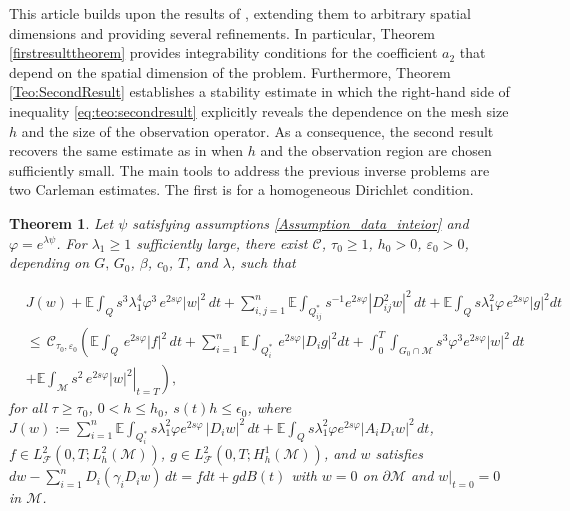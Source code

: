 \documentclass[11pt,oneside,leqno]{amsart}
\numberwithin{equation}{section}
\numberwithin{equation}{section}
\newcommand{\E}{\mathbb{E}}
\newtheorem{theorem}{Theorem}[section]
\begin{document}
This article builds upon the results of \cite{WWW:2024}, extending them to arbitrary spatial dimensions and providing several refinements. In particular, Theorem \ref{firstresulttheorem} provides integrability conditions for the coefficient $a_2$ that depend on the spatial dimension of the problem. Furthermore, Theorem \ref{Teo:SecondResult} establishes a stability estimate in which the right-hand side of inequality \eqref{eq:teo:secondresult} explicitly reveals the dependence on the mesh size $h$ and the size of the observation operator. As a consequence, the second result recovers the same estimate as in \cite{WWW:2024} when $h$ and the observation region are chosen sufficiently small. The main tools to address the previous inverse problems are two Carleman estimates. The first is for a homogeneous Dirichlet condition.
{ 
\begin{theorem}\label{theo:Carleman_datainterior}
Let $\psi$ satisfying assumptions \ref{Assumption_data_inteior} and $\varphi=e^{\lambda\psi}$. For $\lambda_1\geq 1$ sufficiently large, there exist $\mathcal{C}$, $\tau_{0}\geq 1$, $h_{0}>0$, $\varepsilon_0 >0$, depending on $G,\,G_0$, $\beta$, $c_0$, $T$, and $\lambda$, such that

\begin{equation}\label{eq:firstCarlemanV2}
\begin{split}
&J(w)+\E\int_{Q}s^{3}\lambda^{4}_{1}\varphi^{3}\,e^{2s\varphi}|w|^{2}\,dt+\sum_{i,j=1}^{n}\E\int_{Q_{ij}^{\ast}}s^{-1}e^{2s\varphi}|D_{ij}^{2}w|^2\, dt+\E\int_{Q}s\lambda_{1}^2\varphi\,e^{2s\varphi}|g|^{2}dt\\
&\leq\,\mathcal{C}_{\tau_{0},\varepsilon_0}\left(\E\int_{Q}\,e^{2s\varphi}|f|^2\,dt+\sum_{i=1}^{n}\E\int_{Q_{i}^{\ast}}\,e^{2s\varphi}|D_{i}g|^{2}dt+\int_{0}^{T}\int_{G_{0}\cap\mathcal{M}}s^{3}\varphi^{3}e^{2s\varphi}|w|^{2}\,dt\right.\\
&\left.+\left.\E\int_{\mathcal{M}}s^2\,e^{2s\varphi}|w|^{2}\right|_{t=T}\right),
\end{split}
\end{equation}
for all $\tau\geq \tau_{0}$, $0<h\leq h_0$, $s(t)h\leq \epsilon_0$, where $\displaystyle J(w):= \sum_{i=1}^{n}\E\int_{Q_{i}^{\ast}}s\lambda_1^2\varphi e^{2s\varphi}\,|D_{i}w|^{2}\,dt+\E\int_{Q}s\lambda_{1}^{2}\varphi e^{2s\varphi}|A_iD_iw|^{2}\,dt$, $f\in L^{2}_{\mathcal{F}}(0,T;L^{2}_{h}(\mathcal{M}))$, $g\in L^{2}_{\mathcal{F}}(0,T;H^{1}_{h}(\mathcal{M}))$, and $w$ satisfies $\displaystyle dw-\sum_{i=1}^{n} D_i(\gamma_i D_{i}w)\,dt=fdt+gdB(t)$ with $w=0$ on $\partial \mathcal{M}$ and $w|_{t=0}=0$ in $\mathcal{M}$.
\end{theorem}
}
\end{document}
